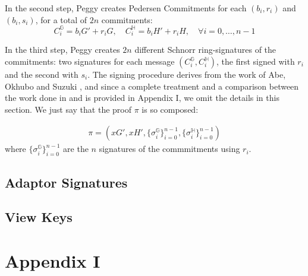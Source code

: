 \documentclass[runningheads]{llncs}
\newcommand{\seq}[2]{#1,\ldots,#2}
\newcommand{\ggroup}{\mathbb{G}}
\newcommand{\hgroup}{\mathbb{H}}
\begin{document}
In the second step, Peggy creates Pedersen Commitments for each $(b_i,r_i)$ and $(b_i,s_i)$, for a total of $2n$ commitments:
$$
C_i^{\ggroup}=b_iG'+r_iG, \quad C_i^{\hgroup}=b_iH'+r_iH, \quad \forall i=\seq 0 {n-1}
$$

In the third step, Peggy creates $2n$ different Schnorr ring-signatures of the commitments: two signatures for each message $(C_i^{\ggroup}, C_i^{\hgroup})$, the first signed with $r_i$ and the second with $s_i$. The signing procedure derives from the work of Abe, Okhubo and Suzuki \cite{abe04}, and since a complete treatment and a comparison between the work done in \cite{dlep} and \cite{abe04} is provided in Appendix I, we omit the details in this section. We just say that the proof $\pi$ is so composed:

\begin{align}
    \pi=(xG', xH', \{\sigma_i^{\ggroup}\}_{i=0}^{n-1}, \{\sigma_i^{\hgroup}\}_{i=0}^{n-1})
\end{align}
\noindent where $\{\sigma_i^{\ggroup}\}_{i=0}^{n-1}$ are the $n$ signatures of the commmitments using $r_i$.
\subsection{Adaptor Signatures}\label{sec:adaptorsignatures}
\subsection{View Keys}\label{sec:viewkeys}
%
%
%



\section*{Appendix I}\label{apx:I}

%
\end{document}
